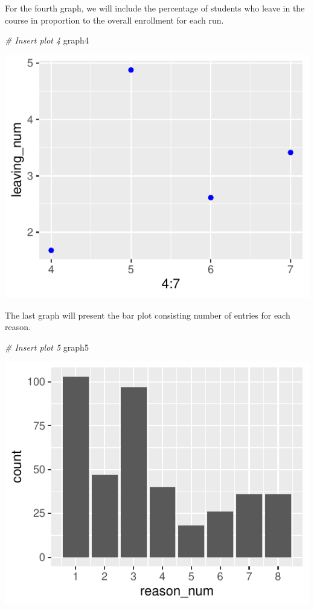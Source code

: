 \documentclass[12pt,]{article}
\newenvironment{Shaded}{\begin{snugshade}}{\end{snugshade}}
\newcommand{\CommentTok}[1]{\textcolor[rgb]{0.56,0.35,0.01}{\textit{#1}}}
\newcommand{\NormalTok}[1]{#1}
\begin{document}
For the fourth graph, we will include the percentage of students who
leave in the course in proportion to the overall enrollment for each
run.

\begin{Shaded}
\begin{Highlighting}[]
\CommentTok{\# Insert plot 4}
\NormalTok{graph4}
\end{Highlighting}
\end{Shaded}

\begin{center}\includegraphics{report_files/figure-latex/unnamed-chunk-16-1} \end{center}

The last graph will present the bar plot consisting number of entries
for each reason.

\begin{Shaded}
\begin{Highlighting}[]
\CommentTok{\# Insert plot 5}
\NormalTok{graph5}
\end{Highlighting}
\end{Shaded}

\begin{center}\includegraphics{report_files/figure-latex/unnamed-chunk-17-1} \end{center}
\end{document}

